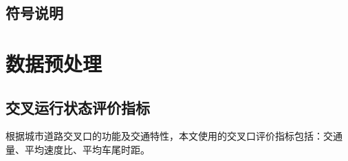 \documentclass[UTF8]{article}
\begin{document}
    \subsection{符号说明}
    
    \begin{table}[h] 
        \centering
        \caption{符号说明}
         
         \label{table_time}
        \end{table}
    \section{数据预处理}
    \subsection{交叉运行状态评价指标}
    根据城市道路交叉口的功能及交通特性，本文使用的交叉口评价指标包括：交通量、平均速度比、平均车尾时距。
\end{document}
